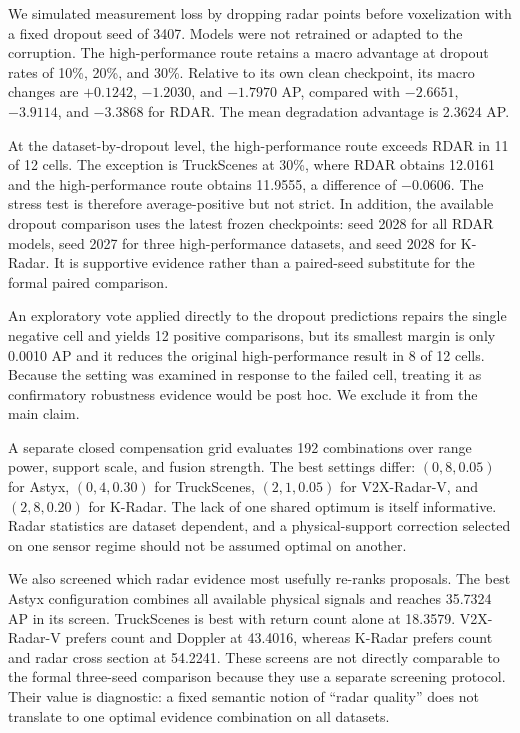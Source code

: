 \documentclass[preprint,12pt,times]{elsarticle}
\begin{document}
We simulated measurement loss by dropping radar points before voxelization
with a fixed dropout seed of 3407. Models were not retrained or adapted to the
corruption. The high-performance route retains a macro advantage at dropout
rates of 10\%, 20\%, and 30\%. Relative
to its own clean checkpoint, its macro changes are $+0.1242$, $-1.2030$, and
$-1.7970$ AP, compared with $-2.6651$, $-3.9114$, and $-3.3868$ for RDAR.
The mean degradation advantage is 2.3624 AP.

At the dataset-by-dropout level, the high-performance route exceeds RDAR in 11
of 12 cells. The exception is TruckScenes at 30\%, where RDAR obtains 12.0161
and the high-performance route obtains 11.9555, a difference of $-0.0606$.
The stress test is therefore average-positive but not strict. In addition, the
available dropout comparison uses the latest frozen checkpoints: seed 2028 for
all RDAR models, seed 2027 for three high-performance datasets, and seed 2028
for K-Radar. It is supportive evidence rather than a paired-seed substitute
for the formal paired comparison.

An exploratory vote applied directly to the dropout predictions repairs the
single negative cell and yields 12 positive comparisons, but its smallest
margin is only 0.0010 AP and it reduces the original high-performance result
in 8 of 12 cells. Because the setting was examined in response to the failed
cell, treating it as confirmatory robustness evidence would be post hoc. We
exclude it from the main claim.

A separate closed compensation grid evaluates 192 combinations over range
power, support scale, and fusion strength. The best settings differ:
$(0,8,0.05)$ for Astyx, $(0,4,0.30)$ for TruckScenes,
$(2,1,0.05)$ for V2X-Radar-V, and $(2,8,0.20)$ for K-Radar. The lack of one
shared optimum is itself informative. Radar statistics are dataset dependent,
and a physical-support correction selected on one sensor regime should not be
assumed optimal on another.

We also screened which radar evidence most usefully re-ranks proposals. The
best Astyx configuration combines all available physical signals and reaches
35.7324 AP in its screen. TruckScenes is best with return count alone at
18.3579. V2X-Radar-V prefers count and Doppler at 43.4016, whereas K-Radar
prefers count and radar cross section at 54.2241. These screens are not
directly comparable to the formal three-seed comparison because they use a separate
screening protocol. Their value is diagnostic: a fixed semantic notion of
``radar quality'' does not translate to one optimal evidence combination on
all datasets.
\end{document}
